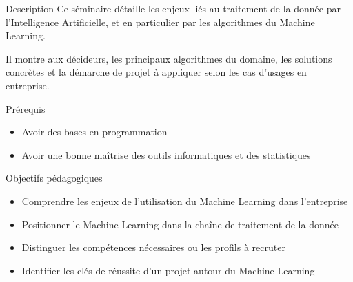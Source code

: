 \begin{frame}{Description}
  Ce séminaire détaille les enjeux liés au traitement de la donnée par l'Intelligence Artificielle, et en particulier par les algorithmes du Machine Learning. 
  
  Il montre aux décideurs, les principaux algorithmes du domaine, les solutions concrètes et la démarche de projet à appliquer selon les cas d'usages en entreprise.

\end{frame}

\begin{frame}{Prérequis}
  \begin{itemize}
    \item Avoir des bases en programmation
    \item Avoir une bonne maîtrise des outils informatiques et des statistiques
  \end{itemize}
\end{frame}

\begin{frame}{Objectifs pédagogiques}
  \begin{itemize}
    \item Comprendre les enjeux de l'utilisation du Machine Learning dans l'entreprise
    \item Positionner le Machine Learning dans la chaîne de traitement de la donnée
    \item Distinguer les compétences nécessaires ou les profils à recruter
    \item Identifier les clés de réussite d'un projet autour du Machine Learning
  \end{itemize}
\end{frame}

